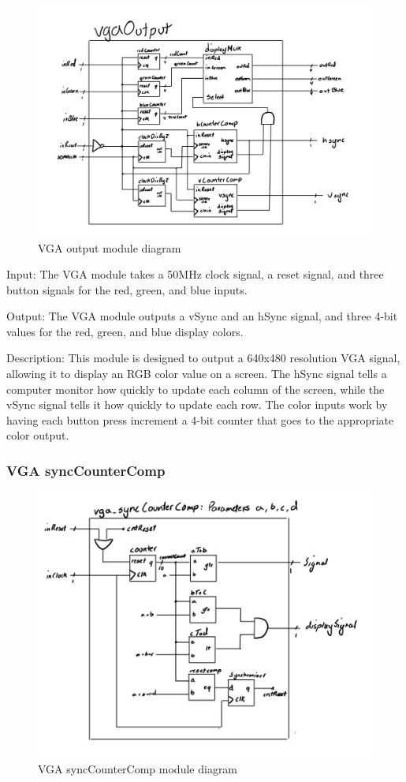 \documentclass[a4paper]{article}
\begin{document}
\begin{figure}[H]
    \includegraphics[width=0.8 \linewidth]{images/vgaOutput.JPG}
    \caption{VGA output module diagram}
    \label{vgaOutputDiagram}
\end{figure}


Input: The VGA module takes a 50MHz clock signal, a reset signal, and three button signals for the red, green, and blue inputs.

Output: The VGA module outputs a vSync and an hSync signal, and three 4-bit values for the red, green, and blue display colors.

Description: This module is designed to output a 640x480 resolution VGA signal, allowing it to display an RGB color value on a screen. The hSync signal tells a computer monitor how quickly to update each column of the screen, while the vSync signal tells it how quickly to update each row. The color inputs work by having each button press increment a 4-bit counter that goes to the appropriate color output.

\subsubsection{VGA syncCounterComp}

\begin{figure}[H]
    \includegraphics[width=0.8 \linewidth]{images/vgasyncCounterComp.JPG}
    \caption{VGA syncCounterComp module diagram}
    \label{vgaSyncCounterCompDiagram}
\end{figure}
\end{document}
